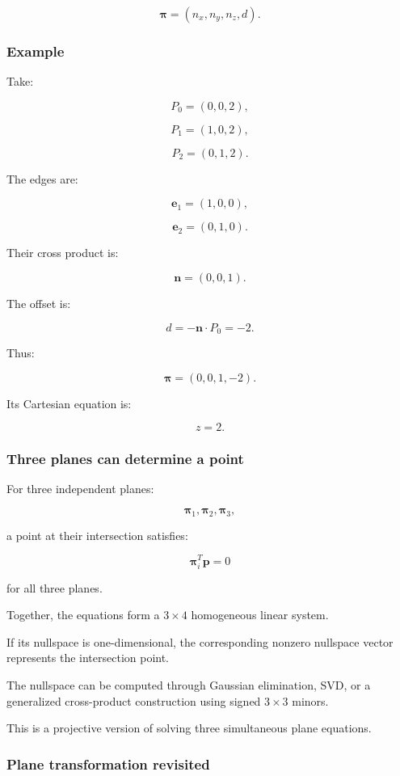 \[
 \boxed{ \boldsymbol\pi= (n_x,n_y,n_z,d) }.
\]

\subsubsection{Example}\label{02-foundations-ii-ch032-example}

Take:

\[
 P_0=(0,0,2),
\]

\[
 P_1=(1,0,2),
\]

\[
 P_2=(0,1,2).
\]

The edges are:

\[
 \mathbf e_1=(1,0,0),
\]

\[
 \mathbf e_2=(0,1,0).
\]

Their cross product is:

\[
 \mathbf n=(0,0,1).
\]

The offset is:

\[
 d=-\mathbf n\cdot P_0=-2.
\]

Thus:

\[
 \boxed{ \boldsymbol\pi=(0,0,1,-2) }.
\]

Its Cartesian equation is:

\[
 \boxed{z=2}.
\]

\subsubsection{Three planes can determine a point}\label{02-foundations-ii-ch032-three-planes-can-determine-a-point}

For three independent planes:

\[
 \boldsymbol\pi_1,\boldsymbol\pi_2,\boldsymbol\pi_3,
\]

a point at their intersection satisfies:

\[
 \boldsymbol\pi_i^T\mathbf p=0
\]

for all three planes.

Together, the equations form a \(3\times4\) homogeneous linear system.

If its nullspace is one-dimensional, the corresponding nonzero nullspace vector represents the intersection point.

The nullspace can be computed through Gaussian elimination, SVD, or a generalized cross-product construction using signed \(3\times3\) minors.

This is a projective version of solving three simultaneous plane equations.

\subsubsection{Plane transformation revisited}\label{02-foundations-ii-ch032-plane-transformation-revisited}


